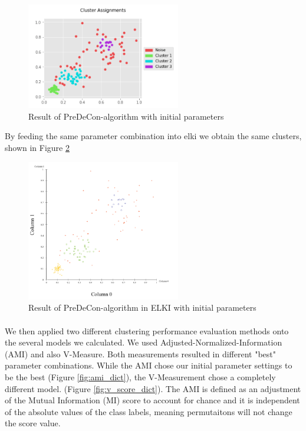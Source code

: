 \documentclass[a4paper]{article}
\begin{document}
\begin{figure}[ht]
	\centering
	\includegraphics[width=0.6\textwidth]{init_paramt.png}
	\caption{Result of PreDeCon-algorithm with initial parameters}
    \label{fig:init_paramt}
\end{figure}

By feeding the same parameter combination into elki we obtain the same clusters, shown in Figure \ref{fig:elki_init_paramt}

\begin{figure}[ht]
	\centering
	\includegraphics[width=0.6\textwidth]{elki_init_paramt.png}
	\caption{ Result of PreDeCon-algorithm in ELKI with initial parameters}
    \label{fig:elki_init_paramt}
\end{figure}
\paragraph{}
We then applied two different clustering performance evaluation methods onto the several models we calculated. We used Adjusted-Normalized-Information (AMI) and also V-Measure. Both measurements resulted in different "best" parameter combinations. While the AMI chose our initial parameter settings to be the best (Figure \ref{fig:ami_dict}), the V-Measurement chose a completely different model. (Figure \ref{fig:v_score_dict}). The AMI is defined as an adjustment of the Mutual Information (MI) score to account for chance and it is independent of the absolute values of the class labels, meaning permutaitons will not change the score value. \cite{scikit-learn}
\end{document}
